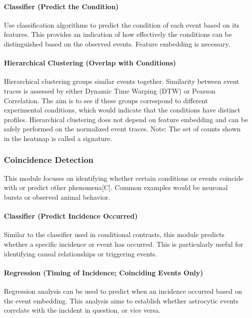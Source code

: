\paragraph{Classifier (Predict the Condition)}
Use classification algorithms to predict the condition of each event based on its features. This provides an indication of how effectively the conditions can be distinguished based on the observed events. Feature embedding is necessary.


\paragraph{Hierarchical Clustering (Overlap with Conditions)}
Hierarchical clustering groups similar events together. Similarity between event traces is assessed by either Dynamic Time Warping (DTW) or Pearson Correlation. The aim is to see if these groups correspond to different experimental conditions, which would indicate that the conditions have distinct profiles. Hierarchical clustering does not depend on feature embedding and can be safely performed on the normalized event traces. Note: The set of counts shown in the heatmap is called a signature.


\subsubsection{Coincidence Detection}
This module focuses on identifying whether certain conditions or events coincide with or predict other phenomena[C]. Common examples would be neuronal bursts or observed animal behavior.

\paragraph{Classifier (Predict Incidence Occurred)}
Similar to the classifier used in conditional contrasts, this module predicts whether a specific incidence or event has occurred. This is particularly useful for identifying causal relationships or triggering events.


\paragraph{Regression (Timing of Incidence; Coinciding Events Only)}
Regression analysis can be used to predict when an incidence occurred based on the event embedding. This analysis aims to establish whether astrocytic events correlate with the incident in question, or vice versa.

